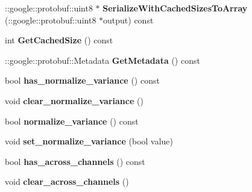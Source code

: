 \begin{DoxyCompactItemize}
\item 
\mbox{\label{classcaffe_1_1_m_v_n_parameter_a3cba91385b88bb53f7b3a0cb1e88913f}} 
\+::google\+::protobuf\+::uint8 $\ast$ {\bfseries Serialize\+With\+Cached\+Sizes\+To\+Array} (\+::google\+::protobuf\+::uint8 $\ast$output) const
\item 
\mbox{\label{classcaffe_1_1_m_v_n_parameter_a8aa1fc24f38dc97259b53359864e4c68}} 
int {\bfseries Get\+Cached\+Size} () const
\item 
\mbox{\label{classcaffe_1_1_m_v_n_parameter_a08bccf481e1445abdd730b80f1d0b3ed}} 
\+::google\+::protobuf\+::\+Metadata {\bfseries Get\+Metadata} () const
\item 
\mbox{\label{classcaffe_1_1_m_v_n_parameter_a361a05178ee7f72bac32eecb505ae040}} 
bool {\bfseries has\+\_\+normalize\+\_\+variance} () const
\item 
\mbox{\label{classcaffe_1_1_m_v_n_parameter_abe1f21974c878537041003f1b4a109c4}} 
void {\bfseries clear\+\_\+normalize\+\_\+variance} ()
\item 
\mbox{\label{classcaffe_1_1_m_v_n_parameter_a0892102b8897ec98139d32c5f3edb0b2}} 
bool {\bfseries normalize\+\_\+variance} () const
\item 
\mbox{\label{classcaffe_1_1_m_v_n_parameter_ae2b2f383b225a893e9b7da730fa069ea}} 
void {\bfseries set\+\_\+normalize\+\_\+variance} (bool value)
\item 
\mbox{\label{classcaffe_1_1_m_v_n_parameter_a7f1eea902742a35a4358dafe9b591fd1}} 
bool {\bfseries has\+\_\+across\+\_\+channels} () const
\item 
\mbox{\label{classcaffe_1_1_m_v_n_parameter_ac6957c7df5f1a9237ea2e2774e7a6bda}} 
void {\bfseries clear\+\_\+across\+\_\+channels} ()
\item 
\mbox{\label{classcaffe_1_1_m_v_n_parameter_a4a16f7f04a586345f73a25ed7b8acebf}} 

\end{DoxyCompactItemize}

